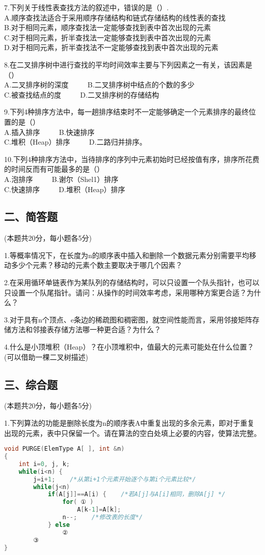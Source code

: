 7.下列关于线性表查找方法的叙述中，错误的是（）. \\
A.顺序查找法适合于采用顺序存储结构和链式存储结构的线性表的查找 \\
B.对于相同元素，顺序查找法一定能够查找到表中首次出现的元素 \\
C.对于相同元素，折半查找法一定能够查找到表中首次出现的元素 \\
D.对于相同元素，折半查找法不一定能够查找到表中首次出现的元素

8.在二叉排序树中进行查找的平均时间效率主要与下列因素之一有关，该因素是（） \\
A.二叉排序树的深度 $\qquad$ B.二叉排序树中结点的个数的多少 \\
C.被查找结点的度 $\qquad$ D.二叉排序树的存储结构

9.下列4种排序方法中，每一趟排序结束时不一定能够确定一个元素排序的最终位置的是（） \\
A.插入排序 $\qquad$ B.快速排序 \\
C.堆积（Heap）排序 $\qquad$ D.二路归并排序。

10.下列4种排序方法中，当待排序的序列中元素初始时已经按值有序，排序所花费的时间反而有可能最多的是（） \\
A.泡排序 $\qquad$ B.谢尔（Shel1）排序 \\
C.快速排序 $\qquad$ D.堆积（Heap）排序

\subsection{二、简答题}
(本题共20分，每小题各5分)

1.等概率情况下，在长度为n的顺序表中插入和删除一个数据元素分别需要平均移动多少个元素？移动的元素个数主要取决于哪几个因素？

2.在采用循环单链表作为某队列的存储结构时，可以只设置一个队头指针，也可以只设置一个队尾指针。请问：从操作的时间效率考虑，采用哪种方案更合适？为什么？

3.对于具有n个顶点、e条边的稀疏图和稠密图，就空间性能而言，采用邻接矩阵存储方法和邻接表存储方法哪一种更合适？为什么？

4.什么是小顶堆积（Heap）？在小顶堆积中，值最大的元素可能处在什么位置？ (可以借助一棵二叉树描述)

\subsection{三、综合题}
(本题共20分，每小题各5分)

1.下列算法的功能是删除长度为n的顺序表A中重复出现的多余元素，即对于重复出现的元素，表中只保留一个。请在算法的空白处填上必要的内容，使算法完整。
\begin{lstlisting}[language=cpp]
void PURGE(ElemType A[ ], int &n)
{
    int i=0, j, k;
    while(i<n) {
        j=i+1;    /*从第i+1个元素开始逐个与第i个元素比较*/
        while(j<n)
            if(A[j]]==A[i) {    /*若A[j]与A[i]相同，删除A[j] */
                for( ① )
                    A[k-1]=A[k];
                n--;    /*修改表的长度*/
            } else
                ②
        ③
}
\end{lstlisting}

